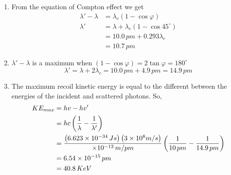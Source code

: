 \documentclass[../main.tex]{subfiles}
\begin{document}
    \begin{soln}
        \begin{enumerate}[label=(\alph*)]
            \item From the equation of Compton effect we get
            \begin{align*}
                \lambda'-\lambda&=\lambda_c(1-\cos\varphi)\\
                \lambda'&=\lambda+\lambda_c(1-\cos 45^\circ)\\
                &=10.0\,pm+0.293\lambda_c\\
                &=10.7\,pm
            \end{align*}
            \item $ \lambda'-\lambda $ is a maximum when $ (1-\cos\varphi)=2\tan \varphi=180^\circ $
            \[\lambda'=\lambda+2\lambda_c=10.0\,pm+4.9\,pm=14.9\,pm\]
            \item The maximum recoil kinetic energy is equal to the different between the energies of the incident and scattered photons. So,
            \begin{align*}
                KE_{max}&=hv-hv'\\
                &=hc\left( \frac{1}{\lambda}-\frac{1}{\lambda'} \right)\\
                &=\frac{\left( 6.623\times 10^{-34}\,Js \right)\left( 3\times 10^{8}m/s \right) }{\times 10^{-12}\,m/pm}\left( \frac{1}{10\,pm}-\frac{1}{14.9\,pm} \right)\\
                &=6.54\times 10^{-15}\,pm\\
                &=40.8\,KeV
            \end{align*}
        \end{enumerate}
    \end{soln}
\end{document}
